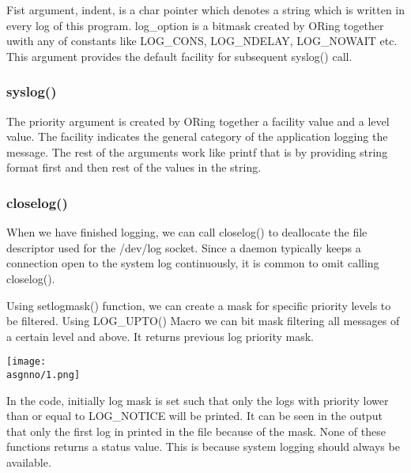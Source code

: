\documentclass[main.tex]{subfiles}
\begin{document}
Fist argument, indent, is a char pointer which denotes a string which is written
in every log of this program. log\_option is a bitmask created by ORing together
uwith any of constants like LOG\_CONS, LOG\_NDELAY, LOG\_NOWAIT etc. This
argument provides the default facility for subsequent syslog() call.

\subsubsection{syslog()}


The priority argument is created by ORing together a facility value and a level
value. The facility indicates the general category of the application logging
the message.  The rest of the arguments work like printf that is by providing
string format first and then rest of the values in the string.

\subsubsection{closelog()}


When we have finished logging, we can call closelog() to deallocate the file
descriptor used for the /dev/log socket. Since a daemon typically keeps a
connection open to the system log continuously, it is common to omit calling
closelog().

\vskip 0.3in

Using setlogmask() function, we can create a mask for specific priority levels
to be filtered. Using LOG\_UPTO() Macro we can bit mask filtering all messages
of a certain level and above. It returns previous log priority mask.



\texttt{[image: \\asgnno/1.png]}

In the code, initially log mask is set such that only the logs with priority
lower than or equal to LOG\_NOTICE will be printed. It can be seen in the output
that only the first log in printed in the file because of the mask. None of
these functions returns a status value. This is because system logging should
always be available.

\clearpage
\end{document}

